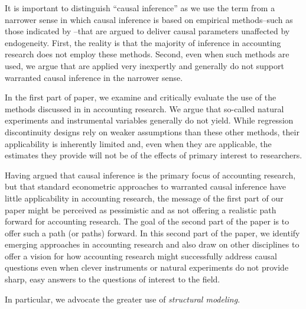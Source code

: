 It is important to distinguish ``causal inference'' as we use the term from a narrower sense in which causal inference is based on empirical methods--such as those indicated by \cite{Angrist:2010jv}--that are argued to deliver causal parameters unaffected by endogeneity. First, the reality is that the majority of inference in accounting research does not employ these methods. Second, even when such methods are used, we argue that are applied very inexpertly and generally do not support warranted causal inference in the narrower sense.

In the first part of paper, we examine and critically evaluate the use of the methods discussed in \cite{Angrist:2010jv} in accounting research. We argue that so-called natural experiments and instrumental variables generally do not yield.
While regression discontinuity designs rely on weaker assumptions than these other methods, their applicability is inherently limited and, even when they are applicable, the estimates they provide will not be of the effects of primary interest to researchers.

Having argued that causal inference is the primary focus of accounting research, but that standard econometric approaches to warranted causal inference have little applicability in accounting research, the message of the first part of our paper might be perceived as pessimistic and as not offering a realistic path forward for accounting research. 
The goal of the second part of the paper is to offer such a path (or paths) forward. 
In this second part of the paper, we identify emerging approaches in accounting research and also draw on other disciplines to offer a vision for how accounting research might successfully address causal questions even when clever instruments or natural experiments do not provide sharp, easy answers to the questions of interest to the field.

In particular, we advocate the greater use of \emph{structural modeling}. 

